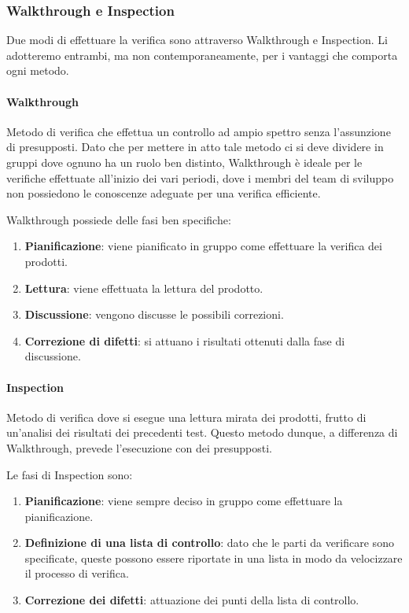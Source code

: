 		\subsubsection{Walkthrough e Inspection}
		Due modi di effettuare la verifica sono attraverso Walkthrough e Inspection.
		Li adotteremo entrambi, ma non contemporaneamente, per i vantaggi che comporta ogni metodo.

			\paragraph{Walkthrough}
			Metodo di verifica che effettua un controllo ad ampio spettro senza l’assunzione di presupposti. Dato che per mettere in atto tale metodo ci
			si deve dividere in gruppi dove ognuno ha un ruolo ben distinto, Walkthrough è ideale per le verifiche effettuate all'inizio dei vari periodi,
			dove i membri del team di sviluppo non possiedono le conoscenze adeguate per una verifica efficiente.

			Walkthrough possiede delle fasi ben specifiche:

			\begin{enumerate}
				\item \textbf{Pianificazione}: viene pianificato in gruppo come effettuare la verifica dei prodotti.
				\item \textbf{Lettura}: viene effettuata la lettura del prodotto.
				\item \textbf{Discussione}: vengono discusse le possibili correzioni.
				\item \textbf{Correzione di difetti}: si attuano i risultati ottenuti dalla fase di discussione.
			\end{enumerate}

			\paragraph{Inspection}
			Metodo di verifica dove si esegue una lettura mirata dei prodotti, frutto di un'analisi dei risultati dei precedenti test.
			Questo metodo dunque, a differenza di Walkthrough, prevede l'esecuzione con dei presupposti.

			Le fasi di Inspection sono:

			\begin{enumerate}
				\item \textbf{Pianificazione}: viene sempre deciso in gruppo come effettuare la pianificazione.
				\item \textbf{Definizione di una lista di controllo}: dato che le parti da verificare sono specificate, queste possono essere
				riportate in una lista in modo da velocizzare il processo di verifica.
				\item \textbf{Correzione dei difetti}: attuazione dei punti della lista di controllo.
			\end{enumerate}

